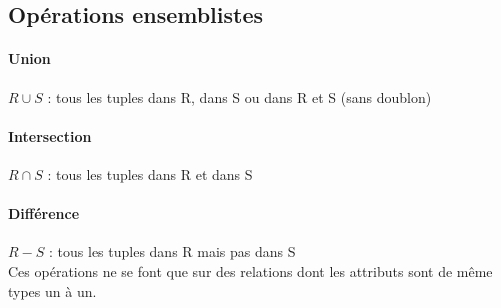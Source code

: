 \documentclass[a4paper]{article}
\begin{document}
  \subsection{Opérations ensemblistes}

  \paragraph{Union} $R \cup S$ : tous les tuples dans R, dans S ou dans R et S (sans doublon)

  \paragraph{Intersection} $R \cap S$ : tous les tuples dans R et dans S

  \paragraph{Différence} $R - S$ : tous les tuples dans R mais pas dans S\\

  Ces opérations ne se font que sur des relations dont les attributs sont
  de même types un à un.
  
\end{document}
